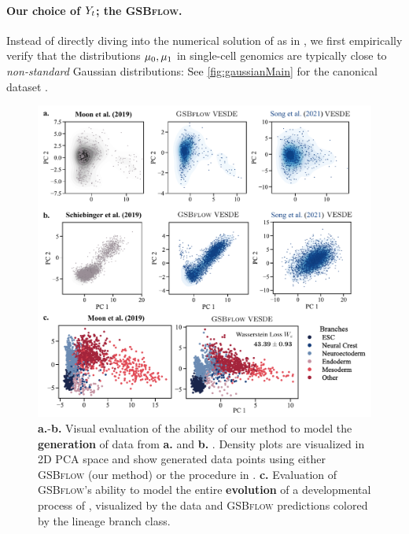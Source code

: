 \paragraph{Our choice of $Y_{ t }$; the \textsc{GSBflow}.}

Instead of directly diving into the numerical solution of  as in \citet{chen2021likelihood}, we first empirically verify that the distributions $\mu_0,\mu_1$ in single-cell genomics are typically close to \emph{non-standard} Gaussian distributions: See \cref{fig:gaussianMain} for the canonical dataset \citep{schiebinger2019optimal}. 

\begin{figure}
     \centering
     \includegraphics[width=\textwidth]{figures/fig_all_predictions.pdf}
    \caption{\textbf{a.}-\textbf{b.} Visual evaluation of the ability of our method to model the \textbf{generation} of data from \textbf{a.} \citet{moon2019visualizing} and \textbf{b.} \citet{schiebinger2019optimal}. Density plots are visualized in 2D PCA space and show generated data points using either \textsc{GSBflow} (our method) or the procedure in \citet{song2020score}. \textbf{c.} Evaluation of \textsc{GSBflow}'s ability to model the entire \textbf{evolution} of a developmental process of \citet{moon2019visualizing}, visualized by the data and \textsc{GSBflow} predictions colored by the lineage branch class.}
    \label{fig:all_results}
\end{figure}

